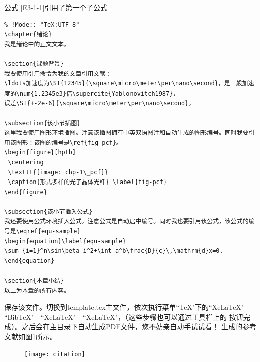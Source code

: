  公式 \eqref{E3-1-1}引用了第一个子公式
\begin{verbatim}
% !Mode:: "TeX:UTF-8"
\chapter{绪论}
我是绪论中的正文文本。

\section{课题背景}
我要使用引用命令为我的文章引用文献：
\ldots加速度为\SI{12345}{\square\micro\meter\per\nano\second}，是一般加速度的\num{1.2345e3}倍\supercite{Yablonovitch1987}，
误差\SI{+-2e-6}{\square\micro\meter\per\nano\second}。

\subsection{该小节插图}
这里我要使用图形环境插图。注意该插图拥有中英双语图注和自动生成的图形编号。同时我要引用该图形：该图的编号是\ref{fig-pcf}。
\begin{figure}[hptb]
 \centering
 \texttt{[image: chp-1\_pcf]}
 \caption{形式多样的光子晶体光纤} \label{fig-pcf}
\end{figure}

\subsection{该小节插入公式}
我还要使用公式环境插入公式。注意公式是自动居中编号。同时我也要引用该公式，该公式的编号是\eqref{equ-sample}
\begin{equation}\label{equ-sample}
\sum_{i=1}^n\sin\beta_i^2+\int_a^b\frac{D}{c}\,\mathrm{d}x=0.
\end{equation}

\section{本章小结}
以上为本章的所有内容。
\end{verbatim}
保存该文件。切换到template.tex主文件，依次执行菜单``TeX"下的``XeLaTeX" - ``BibTeX" - ``XeLaTeX" - ``XeLaTeX"，（这些步骤也可以通过工具栏上的
按钮完成）。之后会在主目录下自动生成PDF文件，您不妨亲自动手试试看！
生成的参考文献如图\ref{fig-ctt}所示。
\begin{figure}[hptb]
 \centering
 \texttt{[image: citation]}
\label{fig-ctt}
\end{figure}

